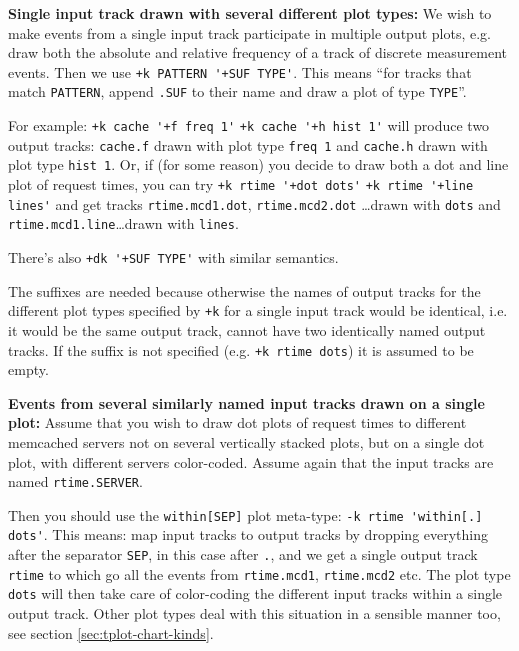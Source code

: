 \documentclass{article}
\begin{document}
\textbf{Single input track drawn with several different plot types:} We wish to make events from a single input track participate in multiple output plots, e.g. draw both the absolute and relative frequency of a track of discrete measurement events. Then we use \verb|+k PATTERN '+SUF TYPE'|. This means ``for tracks that match \verb|PATTERN|, append \verb|.SUF| to their name and draw a plot of type \verb|TYPE|''. 

For example: \verb|+k cache '+f freq 1'| \verb|+k cache '+h hist 1'| will produce two output tracks: \verb|cache.f| drawn with plot type \verb|freq 1| and \verb|cache.h| drawn with plot type \verb|hist 1|. Or, if (for some reason) you decide to draw both a dot and line plot of request times, you can try \verb|+k rtime '+dot dots'| \verb|+k rtime '+line lines'| and get tracks \verb|rtime.mcd1.dot|, \verb|rtime.mcd2.dot| \ldots drawn with \verb|dots| and \verb|rtime.mcd1.line|\ldots drawn with \verb|lines|. 

There's also \verb|+dk '+SUF TYPE'| with similar semantics. 

The suffixes are needed because otherwise the names of output tracks for the different plot types specified by \verb|+k| for a single input track would be identical, i.e. it would be the same output track, \timeplot{} cannot have two identically named output tracks. If the suffix is not specified (e.g. \verb|+k rtime dots|) it is assumed to be empty.

\textbf{Events from several similarly named input tracks drawn on a single plot:} Assume that you wish to draw dot plots of request times to different memcached servers not on several vertically stacked plots, but on a single dot plot, with different servers color-coded. Assume again that the input tracks are named \verb|rtime.SERVER|. 

Then you should use the \verb|within[SEP]| plot meta-type: \verb|-k rtime 'within[.] dots'|. This means: map input tracks to output tracks by dropping everything after the separator \verb|SEP|, in this case after \verb|.|, and we get a single output track \verb|rtime| to which go all the events from \verb|rtime.mcd1|, \verb|rtime.mcd2| etc. The plot type \verb|dots| will then take care of color-coding the different input tracks within a single output track. Other plot types deal with this situation in a sensible manner too, see section \ref{sec:tplot-chart-kinds}.

\pagebreak
\end{document}
